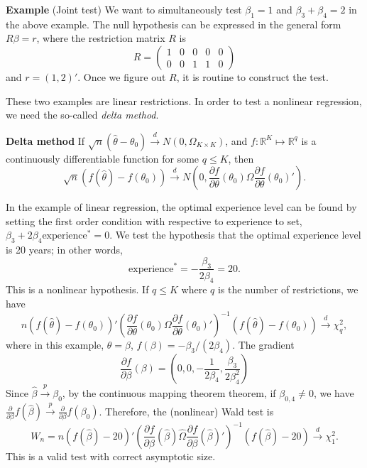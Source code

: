 \documentclass[11pt]{article}
\begin{document}
\textbf{Example} (Joint test) We want to simultaneously test
\(\beta_{1}=1\) and \(\beta_{3}+\beta_{4}=2\) in the above example. The
null hypothesis can be expressed in the general form \(R\beta=r\), where
the restriction matrix \(R\) is \[R=\begin{pmatrix}1 & 0 & 0 & 0 & 0\\
0 & 0 & 1 & 1 & 0
\end{pmatrix}\] and \(r=\left(1,2\right)'\). Once we figure out \(R\),
it is routine to construct the test.

    These two examples are linear restrictions. In order to test a nonlinear
regression, we need the so-called \emph{delta method}.

\textbf{Delta method} If
\(\sqrt{n}\left(\widehat{\theta}-\theta_{0}\right)\stackrel{d}{\to}N\left(0,\Omega_{K\times K}\right)\),
and \(f:\mathbb{R}^{K}\mapsto\mathbb{R}^{q}\) is a continuously
differentiable function for some \(q\leq K\), then
\[\sqrt{n}\left(f\left(\widehat{\theta}\right)-f\left(\theta_{0}\right)\right)\stackrel{d}{\to}N\left(0,\frac{\partial f}{\partial\theta}\left(\theta_{0}\right)\Omega\frac{\partial f}{\partial\theta}\left(\theta_{0}\right)'\right).\]

    In the example of linear regression, the optimal experience level can be
found by setting the first order condition with respective to experience
to set, \(\beta_{3}+2\beta_{4}\mbox{experience}^{*}=0\). We test the
hypothesis that the optimal experience level is 20 years; in other
words, \[\mbox{experience}^{*}=-\frac{\beta_{3}}{2\beta_{4}}=20.\] This
is a nonlinear hypothesis. If \(q\leq K\) where \(q\) is the number of
restrictions, we have
\[n\left(f\left(\widehat{\theta}\right)-f\left(\theta_{0}\right)\right)'\left(\frac{\partial f}{\partial\theta}\left(\theta_{0}\right)\Omega\frac{\partial f}{\partial\theta}\left(\theta_{0}\right)'\right)^{-1}\left(f\left(\widehat{\theta}\right)-f\left(\theta_{0}\right)\right)\stackrel{d}{\to}\chi_{q}^{2},\]
where in this example, \(\theta=\beta\),
\(f\left(\beta\right)=-\beta_{3}/\left(2\beta_{4}\right)\). The gradient
\[\frac{\partial f}{\partial\beta}\left(\beta\right)=\left(0,0,-\frac{1}{2\beta_{4}},\frac{\beta_{3}}{2\beta_{4}^{2}}\right)\]
Since \(\widehat{\beta}\stackrel{p}{\to}\beta_{0}\), by the continuous
mapping theorem theorem, if \(\beta_{0,4}\neq0\), we have
\(\frac{\partial}{\partial\beta}f\left(\widehat{\beta}\right)\stackrel{p}{\to}\frac{\partial}{\partial\beta}f\left(\beta_{0}\right)\).
Therefore, the (nonlinear) Wald test is
\[W_{n}=n\left(f\left(\widehat{\beta}\right)-20\right)'\left(\frac{\partial f}{\partial\beta}\left(\widehat{\beta}\right)\widehat{\Omega}\frac{\partial f}{\partial\beta}\left(\widehat{\beta}\right)'\right)^{-1}\left(f\left(\widehat{\beta}\right)-20\right)\stackrel{d}{\to}\chi_{1}^{2}.\]
This is a valid test with correct asymptotic size.
\end{document}
